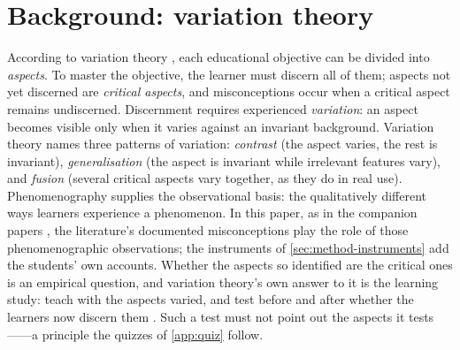 \mode*
\section{Background: variation theory}
\label{sec:background}

According to variation theory \autocite[Ch.~2]{NCOL}, each educational
objective can be divided into \emph{aspects}.
To master the objective, the learner must discern all of them; aspects not
yet discerned are \emph{critical aspects}, and misconceptions occur when a
critical aspect remains undiscerned.
Discernment requires experienced \emph{variation}: an aspect becomes
visible only when it varies against an invariant background.
Variation theory names three patterns of variation:
\emph{contrast} (the aspect varies, the rest is invariant),
\emph{generalisation} (the aspect is invariant while irrelevant features
vary), and
\emph{fusion} (several critical aspects vary together, as they do in real
use).
Phenomenography \autocite{Phenomenography,Neuman1987} supplies the
observational basis: the qualitatively different ways learners experience a
phenomenon.
In this paper, as in the companion papers
\autocite{VTProgMisconceptions,VTDebug,VTTerminal}, the literature's
documented misconceptions play the role of those phenomenographic
observations; the instruments of \cref{sec:method-instruments} add the
students' own accounts.
Whether the aspects so identified are the critical ones is an empirical
question, and variation theory's own answer to it is the learning study:
teach with the aspects varied, and test before and after whether the
learners now discern them \autocite[Ch.~7]{NCOL}\autocite{PangMarton2005,Kullberg2017ZDM}.
Such a test must not point out the aspects it tests------a principle the quizzes of \cref{app:quiz} follow.


